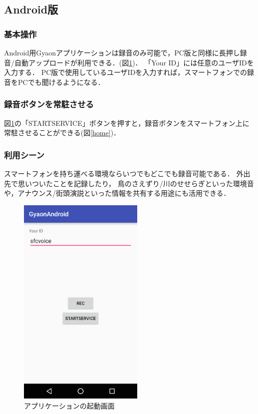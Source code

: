 
\subsection{Android版}

\subsubsection{基本操作}
Android用Gyaonアプリケーションは録音のみ可能で，PC版と同様に長押し録音/自動アップロードが利用できる．(図\ref{app})．
「Your ID」には任意のユーザIDを入力する．
PC版で使用しているユーザIDを入力すれば，スマートフォンでの録音をPCでも聞けるようになる．

\subsubsection{録音ボタンを常駐させる}
図\ref{app}の「STARTSERVICE」ボタンを押すと，録音ボタンをスマートフォン上に常駐させることができる(図\ref{home})．

\subsubsection{利用シーン}
スマートフォンを持ち運べる環境ならいつでもどこでも録音可能である．
外出先で思いついたことを記録したり，
鳥のさえずり/川のせせらぎといった環境音や，アナウンス/街頭演説といった情報を共有する用途にも活用できる．

\begin{figure}[H]
\centering
\includegraphics[width=6cm]{images/app.png}
\caption{アプリケーションの起動画面}
\label{app}
\end{figure}

